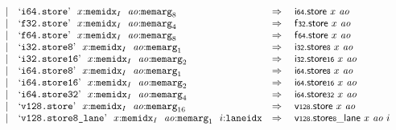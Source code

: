 $$\begin{array}[t]{@{}lrrl@{}l@{}l@{}l@{}}
& & | & \mbox{‘\texttt{i64.store}’}~~x{:}{{\mathtt{memidx}}}_{I}~~{\mathit{ao}}{:}{{\mathtt{memarg}}}_{8} & \quad\Rightarrow\quad{} & \mathsf{i{\scriptstyle 64}}{.}\mathsf{store}~x~{\mathit{ao}} \\
& & | & \mbox{‘\texttt{f32.store}’}~~x{:}{{\mathtt{memidx}}}_{I}~~{\mathit{ao}}{:}{{\mathtt{memarg}}}_{4} & \quad\Rightarrow\quad{} & \mathsf{f{\scriptstyle 32}}{.}\mathsf{store}~x~{\mathit{ao}} \\
& & | & \mbox{‘\texttt{f64.store}’}~~x{:}{{\mathtt{memidx}}}_{I}~~{\mathit{ao}}{:}{{\mathtt{memarg}}}_{8} & \quad\Rightarrow\quad{} & \mathsf{f{\scriptstyle 64}}{.}\mathsf{store}~x~{\mathit{ao}} \\
& & | & \mbox{‘\texttt{i32.store8}’}~~x{:}{{\mathtt{memidx}}}_{I}~~{\mathit{ao}}{:}{{\mathtt{memarg}}}_{1} & \quad\Rightarrow\quad{} & {\mathsf{i{\scriptstyle 32}}{.}\mathsf{store}}{\mathsf{{\scriptstyle 8}}}~x~{\mathit{ao}} \\
& & | & \mbox{‘\texttt{i32.store16}’}~~x{:}{{\mathtt{memidx}}}_{I}~~{\mathit{ao}}{:}{{\mathtt{memarg}}}_{2} & \quad\Rightarrow\quad{} & {\mathsf{i{\scriptstyle 32}}{.}\mathsf{store}}{\mathsf{{\scriptstyle 16}}}~x~{\mathit{ao}} \\
& & | & \mbox{‘\texttt{i64.store8}’}~~x{:}{{\mathtt{memidx}}}_{I}~~{\mathit{ao}}{:}{{\mathtt{memarg}}}_{1} & \quad\Rightarrow\quad{} & {\mathsf{i{\scriptstyle 64}}{.}\mathsf{store}}{\mathsf{{\scriptstyle 8}}}~x~{\mathit{ao}} \\
& & | & \mbox{‘\texttt{i64.store16}’}~~x{:}{{\mathtt{memidx}}}_{I}~~{\mathit{ao}}{:}{{\mathtt{memarg}}}_{2} & \quad\Rightarrow\quad{} & {\mathsf{i{\scriptstyle 64}}{.}\mathsf{store}}{\mathsf{{\scriptstyle 16}}}~x~{\mathit{ao}} \\
& & | & \mbox{‘\texttt{i64.store32}’}~~x{:}{{\mathtt{memidx}}}_{I}~~{\mathit{ao}}{:}{{\mathtt{memarg}}}_{4} & \quad\Rightarrow\quad{} & {\mathsf{i{\scriptstyle 64}}{.}\mathsf{store}}{\mathsf{{\scriptstyle 32}}}~x~{\mathit{ao}} \\
& & | & \mbox{‘\texttt{v128.store}’}~~x{:}{{\mathtt{memidx}}}_{I}~~{\mathit{ao}}{:}{{\mathtt{memarg}}}_{16} & \quad\Rightarrow\quad{} & \mathsf{v{\scriptstyle 128}}{.}\mathsf{store}~x~{\mathit{ao}} \\
& & | & \mbox{‘\texttt{v128.store8\_lane}’}~~x{:}{{\mathtt{memidx}}}_{I}~~{\mathit{ao}}{:}{{\mathtt{memarg}}}_{1}~~i{:}{\mathtt{laneidx}} & \quad\Rightarrow\quad{} & {\mathsf{v{\scriptstyle 128}}{.}\mathsf{store}}{\mathsf{{\scriptstyle 8}}}{\mathsf{\_}}{\mathsf{lane}}~x~{\mathit{ao}}~i \\

\end{array}$$
